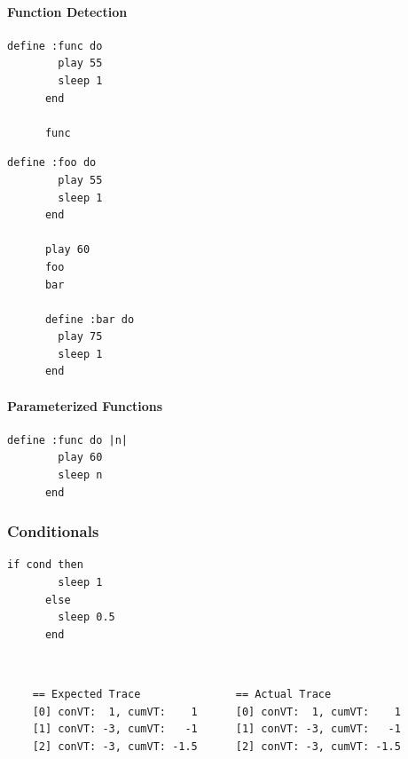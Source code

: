 \documentclass[11pt, abstracton, twoside, titlepage=true]{scrartcl}
\begin{document}
\paragraph{Function Detection}
\begin{minipage}{\textwidth}
	\begin{lstlisting}[style = sonicpi]
      define :func do
        play 55
        sleep 1
      end

      func
	\end{lstlisting}
\end{minipage}

\begin{minipage}{\textwidth}
	\begin{lstlisting}[style = sonicpi]
      define :foo do
        play 55
        sleep 1
      end

      play 60
      foo
      bar

      define :bar do
        play 75
        sleep 1
      end
	\end{lstlisting}
\end{minipage}

\paragraph{Parameterized Functions}
\begin{minipage}{\textwidth}
	\begin{lstlisting}[style = sonicpi]
      define :func do |n|
        play 60
        sleep n
      end
	\end{lstlisting}
\end{minipage}

\subsubsection{Conditionals}
\begin{minipage}{\textwidth}
	\begin{lstlisting}[style = sonicpi]
      if cond then
        sleep 1
      else
        sleep 0.5
      end
	\end{lstlisting}
\end{minipage}
\\
\begin{lstlisting}
    == Expected Trace               == Actual Trace
    [0] conVT:  1, cumVT:    1      [0] conVT:  1, cumVT:    1
    [1] conVT: -3, cumVT:   -1      [1] conVT: -3, cumVT:   -1
    [2] conVT: -3, cumVT: -1.5      [2] conVT: -3, cumVT: -1.5
\end{lstlisting}
\end{document}
